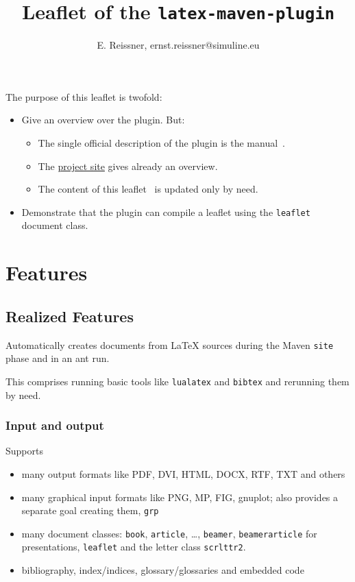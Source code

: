 \documentclass[a4paper,notumble,10pt,english]{leaflet}%
\title{Leaflet of the \texttt{latex-maven-plugin}}
\author{E. Reissner, ernst.reissner@simuline.eu}
\date{\Today}
\begin{document}
\maketitle

The purpose of this leaflet is twofold:
%
\begin{itemize}
  \item Give an overview over the plugin. 
  But: 
  \begin{itemize}
    \item The single official description of the plugin is the manual~\cite{LatexPlugin}.
    \item The 
    \href{http://simuline.eu/LatexMavenPlugin/index.html}{project site} 
    gives already an overview. 
    \item 
    The content of this leaflet~\cite{LeafLeaf} is updated only by need. 
  \end{itemize}
  
  \item Demonstrate that the plugin can compile a leaflet using the \texttt{leaflet} document class. 
\end{itemize}

\section{Features}

\subsection{Realized Features}

Automatically creates documents from LaTeX sources during the Maven \texttt{site} phase 
and in an ant run. 

This comprises running basic tools like \texttt{lualatex} and \texttt{bibtex} 
and rerunning them by need. 

\subsubsection{Input and output}

Supports 
\begin{itemize}
  \item
  many output formats like PDF, DVI, HTML, DOCX, RTF, TXT and others
  \item
  many graphical input formats like PNG, MP, FIG, gnuplot; 
  also provides a separate goal creating them, \texttt{grp} 
  \item
  many document classes: \texttt{book}, \texttt{article}, \dots, 
  \texttt{beamer}, \texttt{beamerarticle} for presentations, 
  \texttt{leaflet} and the letter class \texttt{scrlttr2}. 
  \item
  bibliography, index/indices, glossary/glossaries and embedded code 
\end{itemize}
\end{document}
